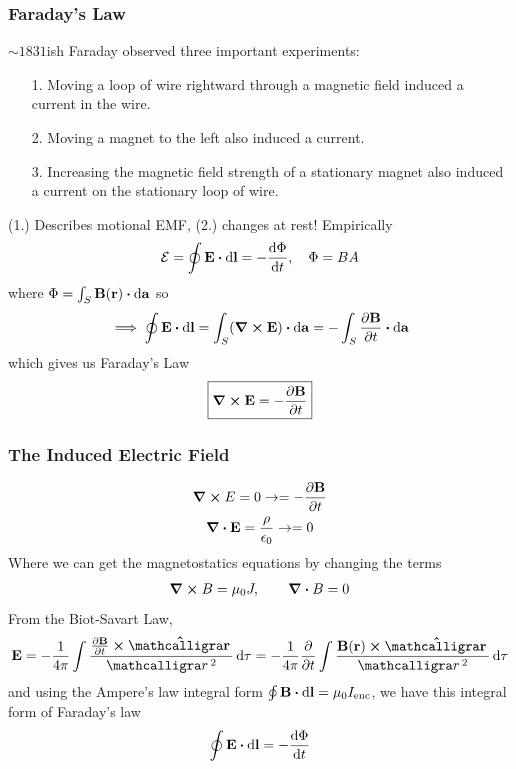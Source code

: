 \documentclass[../main.tex]{subfiles}
\begin{document}
\subsubsection{Faraday's Law}
$\sim 1831$ish Faraday observed three important experiments:
\begin{itemize}
    \item [1.] Moving a loop of wire rightward through a magnetic field induced a current in the wire.
    \item [2.] Moving a magnet to the left also induced a current.
    \item [3.] Increasing the magnetic field strength of a stationary magnet also induced a current on the
    stationary loop of wire.
\end{itemize}
(1.) Describes motional EMF, (2.) changes at rest! Empirically
\begin{align*}
    \mathcal{E} = \oint \vb E \vdot \dd{\vb l} = - \dv{\Phi}{t}, \quad \Phi = B A
\end{align*}
where $\Phi = \int_S \vb B(\vb r) \vdot \dd{\vb a}$ so
\begin{align*}
    \implies \oint \vb E \vdot \dd{\vb l} = \int_S (\curl \vb E) \vdot \dd{\vb a} = - \int_S \pdv{\vb B}{t} \vdot \dd{\vb a}
\end{align*}
which gives us Faraday's Law
\begin{align*}
    \boxed{
        \curl \vb E = -\pdv{\vb B}{t}
    }
\end{align*}

\subsubsection{The Induced Electric Field}
\begin{gather*}
    \curl E = 0 \to = -\pdv{\vb B}{t} \\
    \div \vb E = \frac{\rho}{\epsilon_0} \to = 0
\end{gather*}
Where we can get the magnetostatics equations by changing the terms
\begin{align*}
    \curl B = \mu_0 J, \qquad \div B = 0
\end{align*}
From the Biot-Savart Law,
\begin{align*}
    \vb E = -\frac{1}{4\pi} \int \frac{\pdv{\vb B}{t} \cross \vu \scriptr}{\scriptr^2} \dd{\tau} = -\frac{1}{4\pi} \pdv{t} \int \frac{\vb B (\vb r) \cross \vu \scriptr}{\scriptr^2} \dd{\tau}
\end{align*}
and using the Ampere's law integral form $\oint \vb B \vdot \dd{\vb l} = \mu_0 I_\text{enc}$, we have this integral form of Faraday's law
\begin{align*}
    \oint \vb E \vdot \dd{\vb l} = -\dv{\Phi}{t}
\end{align*}
\end{document}
